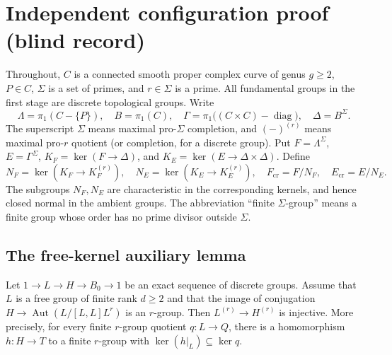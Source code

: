 \section{Independent configuration proof (blind record)}
\label{sec:configuration-blind}

Throughout, $C$ is a connected smooth proper complex curve of genus $g\geq2$,
$P\in C$, $\Sigma$ is a set of primes, and $r\in\Sigma$ is a prime.
All fundamental groups in the first stage are discrete topological groups.
Write
\[
 \Lambda=\pi_1(C-\{P\}),\quad B=\pi_1(C),\quad
 \Gamma=\pi_1\bigl((C\times C)-\operatorname{diag}\bigr),\quad
 \Delta=B^\Sigma.
\]
The superscript $\Sigma$ means maximal pro-$\Sigma$ completion, and
$(-)^{(r)}$ means maximal pro-$r$ quotient (or completion, for a discrete
group). Put $F=\Lambda^\Sigma$, $E=\Gamma^\Sigma$,
$K_F=\ker(F\to\Delta)$, and $K_E=\ker(E\to\Delta\times\Delta)$.
Define
\[
 N_F=\ker(K_F\to K_F^{(r)}),\quad
 N_E=\ker(K_E\to K_E^{(r)}),\quad
 F_{\mathrm{cr}}=F/N_F,\quad E_{\mathrm{cr}}=E/N_E.
\]
The subgroups $N_F,N_E$ are characteristic in the corresponding kernels,
and hence closed normal in the ambient groups. The abbreviation
``finite $\Sigma$-group'' means a finite group whose order has no prime
divisor outside $\Sigma$.

\subsection{The free-kernel auxiliary lemma}

\begin{lemma}\label{lem:blind-free-kernel}
Let $1\to L\to H\to B_0\to1$ be an exact sequence of discrete groups.
Assume that $L$ is a free group of finite rank $d\geq2$ and that the image
of conjugation $H\to\operatorname{Aut}(L/[L,L]L^r)$ is an $r$-group.
Then $L^{(r)}\to H^{(r)}$ is injective. More precisely, for every finite
$r$-group quotient $q:L\to Q$, there is a homomorphism $h:H\to T$ to a
finite $r$-group with $\ker(h|_L)\subseteq\ker q$.
\end{lemma}


